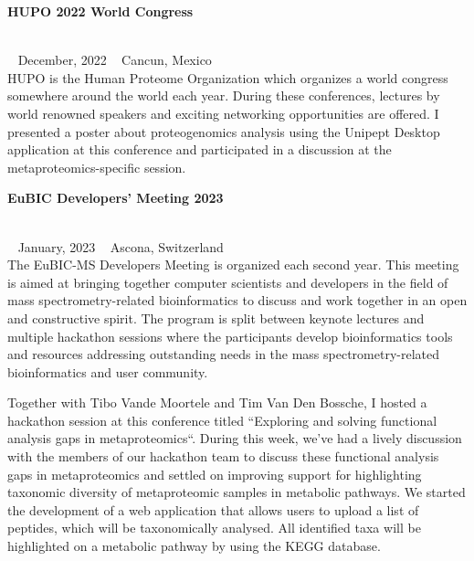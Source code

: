 \begin{large}\textbf{\textsf{HUPO 2022 World Congress}}\end{large} \\
\faCalendar ~ \textsf{December, 2022} \hfill \faGlobe ~ \textsf{Cancun, Mexico} \\
HUPO is the Human Proteome Organization which organizes a world congress somewhere around the world each year.
During these conferences, lectures by world renowned speakers and exciting networking opportunities are offered.
I presented a poster about proteogenomics analysis using the Unipept Desktop application at this conference and participated in a discussion at the metaproteomics-specific session.

\begin{large}\textbf{\textsf{EuBIC Developers' Meeting 2023}}\end{large} \\
\faCalendar ~ \textsf{January, 2023} \hfill \faGlobe ~ \textsf{Ascona, Switzerland} \\
The EuBIC-MS Developers Meeting is organized each second year.
This meeting is aimed at bringing together computer scientists and developers in the field of mass spectrometry-related bioinformatics to discuss and work together in an open and constructive spirit.
The program is split between keynote lectures and multiple hackathon sessions where the participants develop bioinformatics tools and resources addressing outstanding needs in the mass spectrometry-related bioinformatics and user community.

Together with Tibo Vande Moortele and Tim Van Den Bossche, I hosted a hackathon session at this conference titled ``Exploring and solving functional analysis gaps in metaproteomics``.
During this week, we've had a lively discussion with the members of our hackathon team to discuss these functional analysis gaps in metaproteomics and settled on improving support for highlighting taxonomic diversity of metaproteomic samples in metabolic pathways.
We started the development of a web application that allows users to upload a list of peptides, which will be taxonomically analysed.
All identified taxa will be highlighted on a metabolic pathway by using the KEGG database.

\newpage
